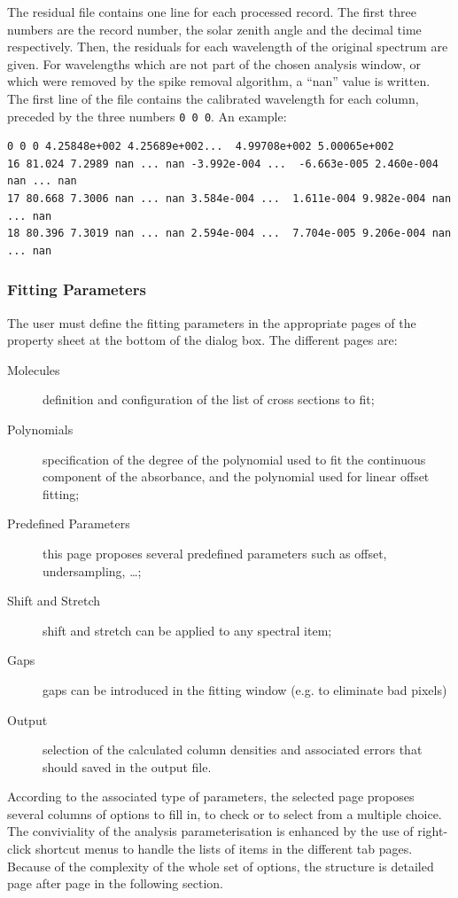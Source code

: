 The residual file contains one line for each processed record.  The
first three numbers are the record number, the solar zenith angle and
the decimal time respectively.  Then, the residuals for each wavelength
of the original spectrum are given.  For wavelengths which are not
part of the chosen analysis window, or which were removed by the spike
removal algorithm, a ``nan'' value is written.  The first line of the
file contains the calibrated wavelength for each column, preceded by
the three numbers \texttt{0 0 0}.  An example:

\begin{Verbatim}[fontfamily=courier,fontsize=\relsize{-2}]
0 0 0 4.25848e+002 4.25689e+002...  4.99708e+002 5.00065e+002
16 81.024 7.2989 nan ... nan -3.992e-004 ...  -6.663e-005 2.460e-004 nan ... nan
17 80.668 7.3006 nan ... nan 3.584e-004 ...  1.611e-004 9.982e-004 nan ... nan
18 80.396 7.3019 nan ... nan 2.594e-004 ...  7.704e-005 9.206e-004 nan ... nan
\end{Verbatim}

\subsubsection{Fitting Parameters}
The user must define the fitting parameters in the appropriate pages of the property sheet at the bottom of the dialog box. The different pages are:

\begin{description}
\item[Molecules] definition and configuration of the list of cross sections to fit;
\item[Polynomials] specification of the degree of the polynomial used to fit the continuous component of the absorbance, and the polynomial used for linear offset fitting;
\item[Predefined Parameters] this page proposes several predefined parameters such as offset, undersampling, \dots  ;
\item[Shift and Stretch] shift and stretch can be applied to any spectral item;
\item[Gaps] gaps can be introduced in the fitting window (e.g. to eliminate bad pixels)
\item[Output] selection of the calculated column densities and associated errors that should saved in the output file.
\end{description}

According to the associated type of parameters, the selected page proposes several columns of options to fill in, to check or to select from a multiple choice. The conviviality of the analysis parameterisation is enhanced by the use of right-click shortcut menus to handle the lists of items in the different tab pages.  Because of the complexity of the whole set of options, the structure is detailed page after page in the following section.

